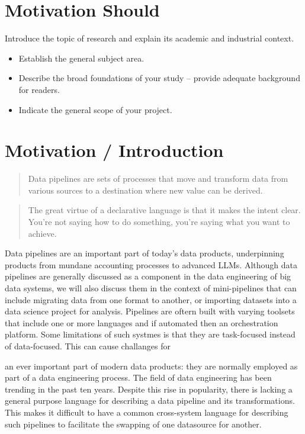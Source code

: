 \section{Motivation Should}\label{motivation-should}

Introduce the topic of research and explain its academic and industrial
context.

\begin{itemize}
\item
  Establish the general subject area.
\item
  Describe the broad foundations of your study -- provide adequate
  background for readers.
\item
  Indicate the general scope of your project.
\end{itemize}

\section{Motivation / Introduction}\label{motivation-introduction}

\begin{quote}
Data pipelines are sets of processes that move and transform data from
various sources to a destination where new value can be derived.
\citep[p.~1]{pipelines_pocket}
\end{quote}

\begin{quote}
The great virtue of a declarative language is that it makes the intent
clear. You're not saying how to do something, you're saying what you
want to achieve. \citep[p.~39]{patterns_eaa}
\end{quote}

Data pipelines are an important part of today's data products,
underpinning products from mundane accounting processes to advanced
LLMs. Although data pipelines are generally discussed as a component in
the data engineering of big data systems, we will also discuss them in
the context of mini-pipelines that can include migrating data from one
format to another, or importing datasets into a data science project for
analysis. Pipelines are oftern built with varying toolsets that include
one or more languages and if automated then an orchestration platform.
Some limitations of such systmes is that they are task-focused instead
of data-focused. This can cause challanges for

an ever important part of modern data products: they are normally
employed as part of a data engineering process. The field of data
engineering has been trending in the past ten years. Despite this rise
in popularity, there is lacking a general purpose language for
describing a data pipeline and its transformations. This makes it
difficult to have a common cross-system language for describing such
pipelines to facilitate the swapping of one datasource for another.

